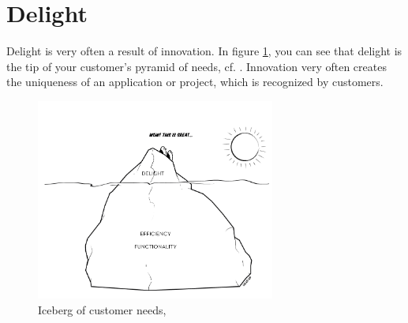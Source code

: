 \section{Delight}

Delight is very often a result of innovation. In figure \ref{fig:DelightIceberg}, you can see that delight is the tip of your customer's pyramid of needs, cf. \cite{Ramfelt}. Innovation very often creates the uniqueness of an application or project, which is recognized by customers. %
\begin{figure}[ht!]
  \centering
    \includegraphics[width=0.7\textwidth]{images/delight}
	\caption{Iceberg of customer needs, \cite[p. 27]{Ramfelt}}
	\label{fig:DelightIceberg}
\end{figure}

